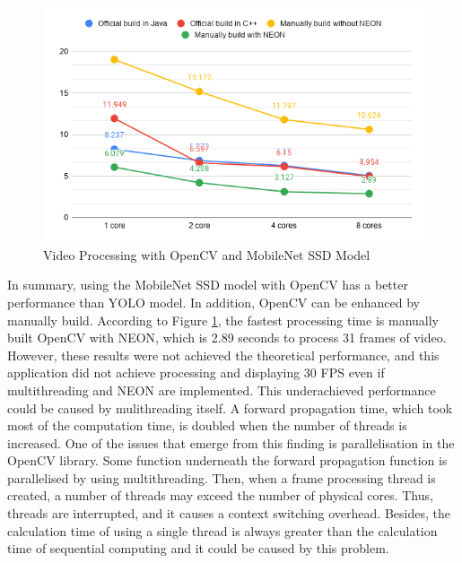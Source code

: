 
    \begin{figure}[!ht]
        \centering
        \includegraphics[width=5in]{images/chapter5/summary/SSD-summary.png}
        \caption{Video Processing with OpenCV and MobileNet SSD Model}
        \label{graphSummary}
    \end{figure}

    In summary, using the MobileNet SSD model with OpenCV has a better performance than YOLO model.
    In addition, OpenCV can be enhanced by manually build.
    According to Figure \ref{graphSummary}, the fastest processing time is manually built OpenCV with NEON,
    which is 2.89 seconds to process 31 frames of video.
    However, these results were not achieved the theoretical performance,
    and this application did not achieve processing and displaying 30 FPS even if
    multithreading and NEON are implemented.
    This underachieved performance could be caused by mulithreading itself.
    A forward propagation time, which took most of the computation time, is doubled when the number of threads is increased.
        One of the issues that emerge from this finding is parallelisation in the OpenCV library.
        Some function underneath the forward propagation function is parallelised by using multithreading.
        Then, when a frame processing thread is created, a number of threads may exceed the number of physical cores.
        Thus, threads are interrupted, and it causes a context switching overhead.
    Besides, the calculation time of using a single thread is always greater than
    the calculation time of sequential computing and it could be caused by this problem.